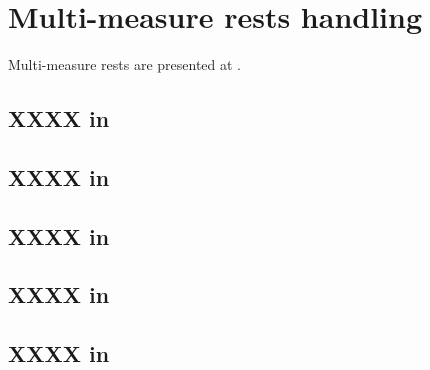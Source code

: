 



\chapter{Multi-measure rests handling}\label{Multi-measure rests handling}

Multi-measure rests are presented at .


\section{XXXX in \mxsrToMsr{}}


\section{XXXX in \mxsrToMsr{}}


\section{XXXX in \msrToMsr{}}


\section{XXXX in \msrToLpsr{}}


\section{XXXX in \lpsrToLilypond{}}


